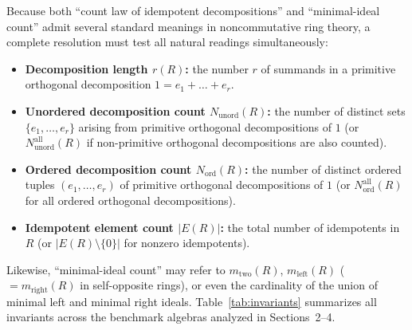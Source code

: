 \documentclass[11pt]{article}
\theoremstyle{definition}
\begin{document}
Because both ``count law of idempotent decompositions'' and ``minimal-ideal
count'' admit several standard meanings in noncommutative ring theory, a
complete resolution must test all natural readings simultaneously:
\begin{itemize}
\item[(C1)] \textbf{Decomposition length $r(R)$:} the number $r$ of summands in a
primitive orthogonal decomposition $1 = e_1 + \dots + e_r$.
\item[(C2)] \textbf{Unordered decomposition count $N_{\mathrm{unord}}(R)$:} the number
of distinct sets $\{e_1, \dots, e_r\}$ arising from primitive orthogonal
decompositions of $1$ (or $N_{\mathrm{unord}}^{\mathrm{all}}(R)$ if
non-primitive orthogonal decompositions are also counted).
\item[(C3)] \textbf{Ordered decomposition count $N_{\mathrm{ord}}(R)$:} the number of
distinct ordered tuples $(e_1, \dots, e_r)$ of primitive orthogonal
decompositions of $1$ (or $N_{\mathrm{ord}}^{\mathrm{all}}(R)$ for all ordered
orthogonal decompositions).
\item[(C4)] \textbf{Idempotent element count $|E(R)|$:} the total number of
idempotents in $R$ (or $|E(R) \setminus \{0\}|$ for nonzero idempotents).
\end{itemize}
Likewise, ``minimal-ideal count'' may refer to $m_{\mathrm{two}}(R)$,
$m_{\mathrm{left}}(R)$ ($= m_{\mathrm{right}}(R)$ in self-opposite rings), or
even the cardinality of the union of minimal left and minimal right ideals.
Table~\ref{tab:invariants} summarizes all invariants across the benchmark
algebras analyzed in Sections~2--4.
\end{document}
